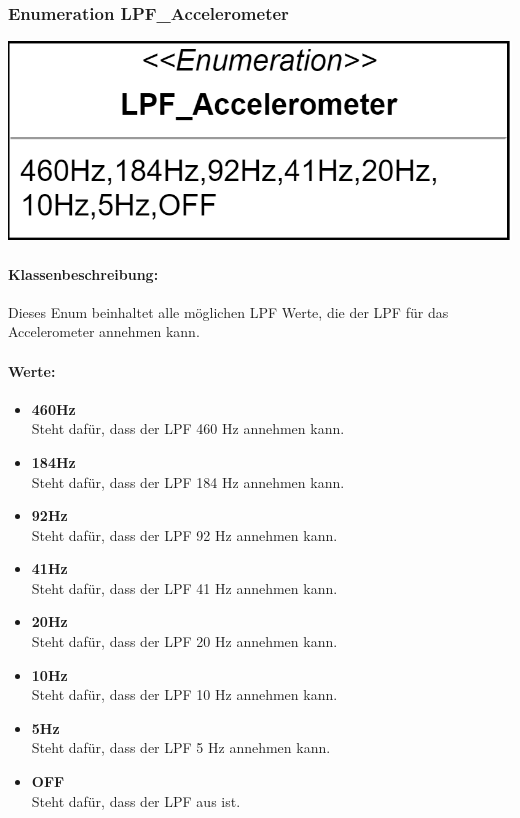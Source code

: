\documentclass[a4paper,12pt]{article}
\begin{document}
\begin{minipage}[b]{0.7\textwidth}
	\subsubsection{Enumeration LPF\_Accelerometer}
	
	\end{minipage}
	\begin{minipage}[c]{0.3\textwidth}
	\includegraphics[width=\textwidth]{bilder/BibPackageKlassen/LPF_Accelerometer.png}
\end{minipage}
\paragraph{Klassenbeschreibung:}
Dieses Enum beinhaltet alle möglichen LPF Werte, die der LPF für das Accelerometer annehmen kann.

\paragraph{Werte:}
\begin{itemize}
	\item \textbf{460Hz}\\Steht dafür, dass der LPF 460 Hz annehmen kann.
	\item \textbf{184Hz}\\Steht dafür, dass der LPF 184 Hz annehmen kann.
	\item \textbf{92Hz}\\Steht dafür, dass der LPF 92 Hz annehmen kann.
	\item \textbf{41Hz}\\Steht dafür, dass der LPF 41 Hz annehmen kann.
	\item \textbf{20Hz}\\Steht dafür, dass der LPF 20 Hz annehmen kann.
	\item \textbf{10Hz}\\Steht dafür, dass der LPF 10 Hz annehmen kann.
	\item \textbf{5Hz}\\Steht dafür, dass der LPF 5 Hz annehmen kann.
	\item \textbf{OFF}\\Steht dafür, dass der LPF aus ist.\\
\end{itemize}
\end{document}
